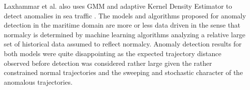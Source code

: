 Laxhammar et al. also uses GMM and adaptive Kernel Density Estimator to detect anomalies in sea traffic \cite{laxhammar2009anomaly}. The models and algorithms proposed for anomaly detection in the maritime domain are more or less data driven in the sense that normalcy is determined by machine learning algorithms analyzing a relative large set of historical data assumed to reflect normalcy. Anomaly detection results for both models were quite disappointing as the expected trajectory distance observed before detection was considered rather large given the rather constrained normal trajectories and the sweeping and stochastic character of the anomalous trajectories.
\label{sec:related}